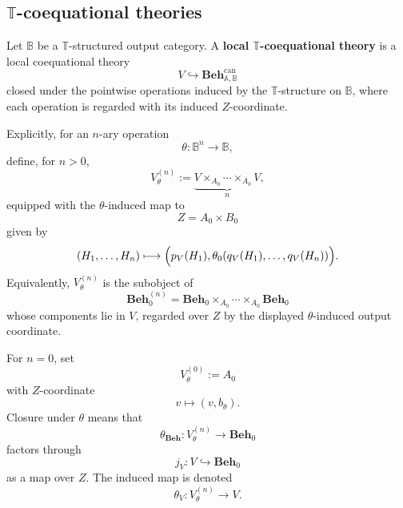 \subsection{\texorpdfstring{\(\mathbb T\)}{T}-coequational theories}
\label{subsec:T-coequational-theories}

\begin{definition}
\label{def:T-coequational-theory}
    Let \(\mathbb B\) be a \(\mathbb T\)-structured output category. A
    \textbf{local \(\mathbb T\)-coequational theory} is a local coequational
    theory
    \[
        V\hookrightarrow\mathbf{Beh}^{\mathrm{can}}_{\mathbb A,\mathbb B}
    \]
    closed under the pointwise operations induced by the \(\mathbb T\)-structure
    on \(\mathbb B\), where each operation is regarded with its induced
    \(Z\)-coordinate.

    Explicitly, for an \(n\)-ary operation
    \[
        \theta:\mathbb B^n\to\mathbb B,
    \]
    define, for \(n>0\),
    \[
        V^{(n)}_\theta
        :=
        \underbrace{V\times_{A_0}\cdots\times_{A_0}V}_{n},
    \]
    equipped with the \(\theta\)-induced map to
    \[
        Z=A_0\times B_0
    \]
    given by
    \[
        (H_1,\dots,H_n)
        \longmapsto
        \Bigl(
            p_V(H_1),
            \theta_0(q_V(H_1),\dots,q_V(H_n))
        \Bigr).
    \]
    Equivalently, \(V^{(n)}_\theta\) is the subobject of
    \[
        \mathbf{Beh}_0^{(n)}
        =
        \mathbf{Beh}_0\times_{A_0}\cdots\times_{A_0}\mathbf{Beh}_0
    \]
    whose components lie in \(V\), regarded over \(Z\) by the displayed
    \(\theta\)-induced output coordinate.

    For \(n=0\), set
    \[
        V^{(0)}_\theta:=A_0
    \]
    with \(Z\)-coordinate
    \[
        v\longmapsto (v,b_\theta).
    \]
    Closure under \(\theta\) means that
    \[
        \theta_{\mathbf{Beh}}:V^{(n)}_\theta\to\mathbf{Beh}_0
    \]
    factors through
    \[
        j_V:V\hookrightarrow\mathbf{Beh}_0
    \]
    as a map over \(Z\). The induced map is denoted
    \[
        \theta_V:V^{(n)}_\theta\to V.
    \]
\end{definition}

